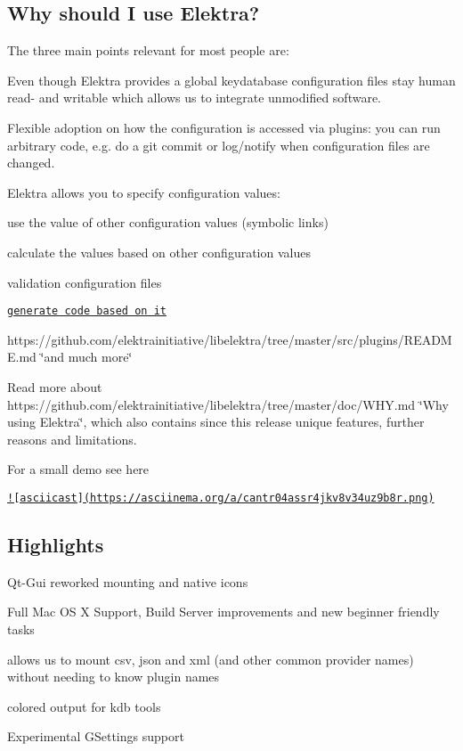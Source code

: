 \subsection*{Why should I use Elektra?}

The three main points relevant for most people are\+:


\begin{DoxyEnumerate}
\item Even though Elektra provides a global keydatabase configuration files stay human read-\/ and writable which allows us to integrate unmodified software.
\item Flexible adoption on how the configuration is accessed via plugins\+: you can run arbitrary code, e.\+g. do a {\ttfamily git commit} or log/notify when configuration files are changed.
\item Elektra allows you to specify configuration values\+:
\begin{DoxyItemize}
\item use the value of other configuration values (symbolic links)
\item calculate the values based on other configuration values
\item validation configuration files
\item \href{https://github.com/elektrainitiative/libelektra/tree/master/src/tools/gen}{\tt generate code based on it}
\item https\+://github.com/elektrainitiative/libelektra/tree/master/src/plugins/\+R\+E\+A\+D\+M\+E.\+md \char`\"{}and much more\char`\"{}
\end{DoxyItemize}
\end{DoxyEnumerate}

Read more about https\+://github.com/elektrainitiative/libelektra/tree/master/doc/\+W\+H\+Y.\+md \char`\"{}\+Why using Elektra\char`\"{}, which also contains since this release unique features, further reasons and limitations.

For a small demo see here

\href{https://asciinema.org/a/cantr04assr4jkv8v34uz9b8r}{\tt !\mbox{[}asciicast\mbox{]}(https\+://asciinema.\+org/a/cantr04assr4jkv8v34uz9b8r.\+png)}

\subsection*{Highlights}


\begin{DoxyItemize}
\item Qt-\/\+Gui reworked mounting and native icons
\item Full Mac O\+S X Support, Build Server improvements and new beginner friendly tasks
\item allows us to mount csv, json and xml (and other common provider names) without needing to know plugin names
\item colored output for kdb tools
\item Experimental G\+Settings support
\end{DoxyItemize}

